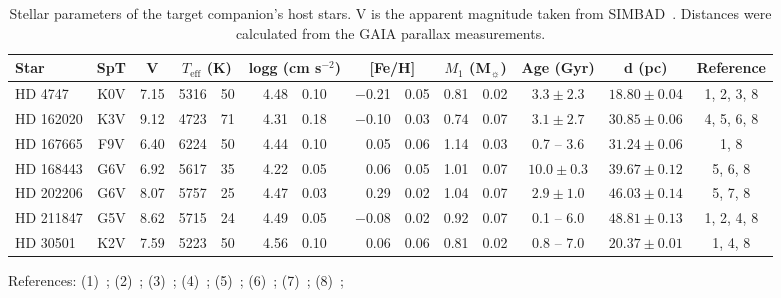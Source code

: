 
\begin{table*}
    \small
    \centering
    \begin{threeparttable}[b]
        \caption{Stellar parameters of the target companion's host stars. V is the apparent magnitude taken from {SIMBAD}~\citep{wenger_simbad_2000}. {Distances were calculated from the GAIA parallax measurements.}}
        \begin{tabular}{l c c r@{$~\pm~$}l r@{$~\pm~$}l r@{$~\pm~$}l r@{$~\pm~$}l c c c}
            \toprule
            Star & SpT & V & \multicolumn{2}{c}{\(T_{\textrm{eff}}\) (K)} &  \multicolumn{2}{c}{logg (cm s\(^{-2} \))}  & \multicolumn{2}{c}{[Fe/H]} &  \multicolumn{2}{c}{\(M_1\) (\textrm{M}\(_{\sun} \))} & Age (Gyr) & d (pc) & Reference\\
            \midrule
            {HD 4747}   & K0V & 7.15 & 5316 & 50 & 4.48 & 0.10 & $-$0.21 & 0.05 & 0.81 & 0.02 & $3.3 \pm 2.3$  & $18.80 \pm 0.04$ & 1, 2, 3, 8 \\
            {HD 162020} & K3V & 9.12 & 4723 & 71 & 4.31 & 0.18 & $-$0.10 & 0.03 & 0.74 & 0.07 & $3.1 \pm 2.7$  & $30.85 \pm 0.06$ & 4, 5, 6, 8 \\
            {HD 167665} & F9V & 6.40 & 6224 & 50 & 4.44 & 0.10 & 0.05    & 0.06 & 1.14 & 0.03 & 0.7 -- 3.6     & $31.24 \pm 0.06$ & 1, 8 \\
            {HD 168443} & G6V & 6.92 & 5617 & 35 & 4.22 & 0.05 & 0.06    & 0.05 & 1.01 & 0.07 & $10.0 \pm 0.3$ & $39.67 \pm 0.12$ & 5, 6, 8 \\
            {HD 202206} & G6V & 8.07 & 5757 & 25 & 4.47 & 0.03 & 0.29    & 0.02 & 1.04 & 0.07 & $2.9 \pm 1.0$  & $46.03 \pm 0.14$ & 5, 7, 8 \\
            {HD 211847} & G5V & 8.62 & 5715 & 24 & 4.49 & 0.05 & $-$0.08 & 0.02 & 0.92 & 0.07 & 0.1 -- 6.0     & $48.81 \pm 0.13$ & 1, 2, 4, 8 \\
            {HD 30501}  & K2V & 7.59 & 5223 & 50 & 4.56 & 0.10 & 0.06    & 0.06 & 0.81 & 0.02 & 0.8 -- 7.0     & $20.37 \pm 0.01$ & 1, 4, 8 \\
            \bottomrule
        \end{tabular} \label{tab:starparams}
        \begin{tablenotes}
           \item[] References: (1)~\citet{sahlmann_search_2011}; (2)~\citet{santos_spectroscopic_2005}; (3)~\citet{crepp_trends_2016}; (4)~\citet{tsantaki_deriving_2013}; (5)~\cite{bonfanti_age_2016}; (6)~\citet{santos_spectroscopic_2004}; (7)~\citet{sousa_spectroscopic_2008}; (8)~\citet{collaboration_gaia_2018};
        \end{tablenotes}
    \end{threeparttable}
\end{table*}
